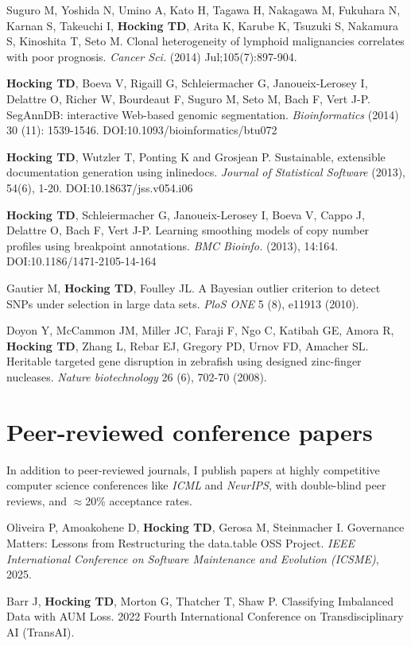 \documentclass[margin,line]{res}
\begin{document}
\begin{resume}
Suguro M, Yoshida N, Umino A, Kato H, Tagawa H, Nakagawa M, Fukuhara
N, Karnan S, Takeuchi I, {\bf Hocking TD}, Arita K, Karube K, Tsuzuki
S, Nakamura S, Kinoshita T, Seto M. Clonal heterogeneity of lymphoid
malignancies correlates with poor prognosis. {\it Cancer Sci.} (2014)
Jul;105(7):897-904.

{\bf Hocking TD}, Boeva V, Rigaill G, Schleiermacher G,
Janoueix-Lerosey I, Delattre O, Richer W, Bourdeaut F, Suguro M, Seto
M, Bach F, Vert J-P. SegAnnDB: interactive Web-based genomic
segmentation. {\it Bioinformatics} (2014) 30 (11):
1539-1546. DOI:10.1093/bioinformatics/btu072

{\bf Hocking TD}, Wutzler T, Ponting K and Grosjean P. Sustainable,
extensible documentation generation using inlinedocs. {\it Journal of
Statistical Software} (2013), 54(6), 1-20. DOI:10.18637/jss.v054.i06

{\bf Hocking TD}, Schleiermacher G, Janoueix-Lerosey I, Boeva V, Cappo
J, Delattre O, Bach F, Vert J-P. Learning smoothing models of copy
number profiles using breakpoint annotations. {\it BMC Bioinfo.} (2013),
14:164. DOI:10.1186/1471-2105-14-164

Gautier M, {\bf Hocking TD}, Foulley JL. A Bayesian outlier criterion
to detect SNPs under selection in large data sets. {\it PloS ONE} 5
(8), e11913 (2010).

Doyon Y, McCammon JM, Miller JC, Faraji F, Ngo C, Katibah GE, Amora R,
{\bf Hocking TD}, Zhang L, Rebar EJ, Gregory PD, Urnov FD, Amacher
SL. Heritable targeted gene disruption in zebrafish using designed
zinc-finger nucleases. {\it Nature biotechnology} 26 (6), 702-70
(2008).

\section{\sc Peer-reviewed conference papers}

In addition to peer-reviewed journals, I publish papers at highly
competitive computer science conferences like {\it ICML} and {\it
  NeurIPS}, with double-blind peer reviews, and $\approx$20\%
acceptance rates.

Oliveira P, Amoakohene D, {\bf Hocking TD}, Gerosa M, Steinmacher I.
Governance Matters: Lessons from Restructuring the data.table OSS Project.
{\it IEEE International Conference on Software Maintenance and Evolution (ICSME)}, 2025.

Barr J, {\bf Hocking TD}, Morton G, Thatcher T, Shaw P. Classifying
Imbalanced Data with AUM Loss. 2022 Fourth International Conference on
Transdisciplinary AI (TransAI). 


\end{resume}
\end{document}
